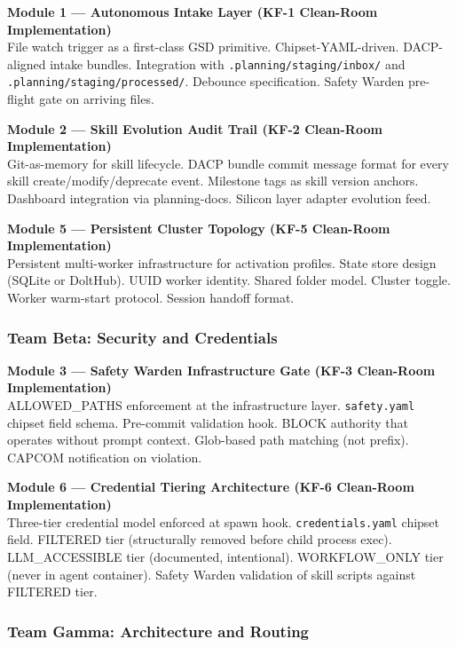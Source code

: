 \documentclass[11pt,letterpaper]{article}
\begin{document}
\textbf{Module 1 --- Autonomous Intake Layer (KF-1 Clean-Room Implementation)}\\
File watch trigger as a first-class GSD primitive. Chipset-YAML-driven. DACP-aligned intake bundles. Integration with \texttt{.planning/staging/inbox/} and \texttt{.planning/staging/processed/}. Debounce specification. Safety Warden pre-flight gate on arriving files.

\textbf{Module 2 --- Skill Evolution Audit Trail (KF-2 Clean-Room Implementation)}\\
Git-as-memory for skill lifecycle. DACP bundle commit message format for every skill create/modify/deprecate event. Milestone tags as skill version anchors. Dashboard integration via planning-docs. Silicon layer adapter evolution feed.

\textbf{Module 5 --- Persistent Cluster Topology (KF-5 Clean-Room Implementation)}\\
Persistent multi-worker infrastructure for activation profiles. State store design (SQLite or DoltHub). UUID worker identity. Shared folder model. Cluster toggle. Worker warm-start protocol. Session handoff format.

\subsubsection{Team Beta: Security and Credentials}

\textbf{Module 3 --- Safety Warden Infrastructure Gate (KF-3 Clean-Room Implementation)}\\
ALLOWED\_PATHS enforcement at the infrastructure layer. \texttt{safety.yaml} chipset field schema. Pre-commit validation hook. BLOCK authority that operates without prompt context. Glob-based path matching (not prefix). CAPCOM notification on violation.

\textbf{Module 6 --- Credential Tiering Architecture (KF-6 Clean-Room Implementation)}\\
Three-tier credential model enforced at spawn hook. \texttt{credentials.yaml} chipset field. FILTERED tier (structurally removed before child process exec). LLM\_ACCESSIBLE tier (documented, intentional). WORKFLOW\_ONLY tier (never in agent container). Safety Warden validation of skill scripts against FILTERED tier.

\subsubsection{Team Gamma: Architecture and Routing}
\end{document}
